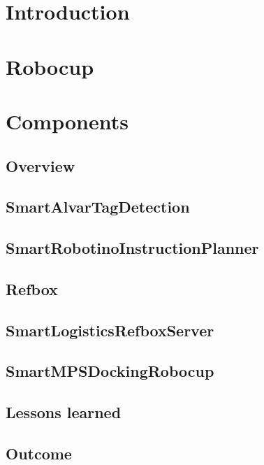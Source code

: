 \documentclass[12pt]{article}
\begin{document}
\section{Introduction}
	

\section{Robocup}
	

\section{Components}

\subsection{Overview}
	
	
\subsection{SmartAlvarTagDetection}
	
	
\subsection{SmartRobotinoInstructionPlanner}
	

\subsection{Refbox}
	

\subsection{SmartLogisticsRefboxServer}
	
	
\subsection{SmartMPSDockingRobocup}
	

\subsection{Lessons learned}
    

\subsection{Outcome}
    
    
\printbibliography
\end{document}
